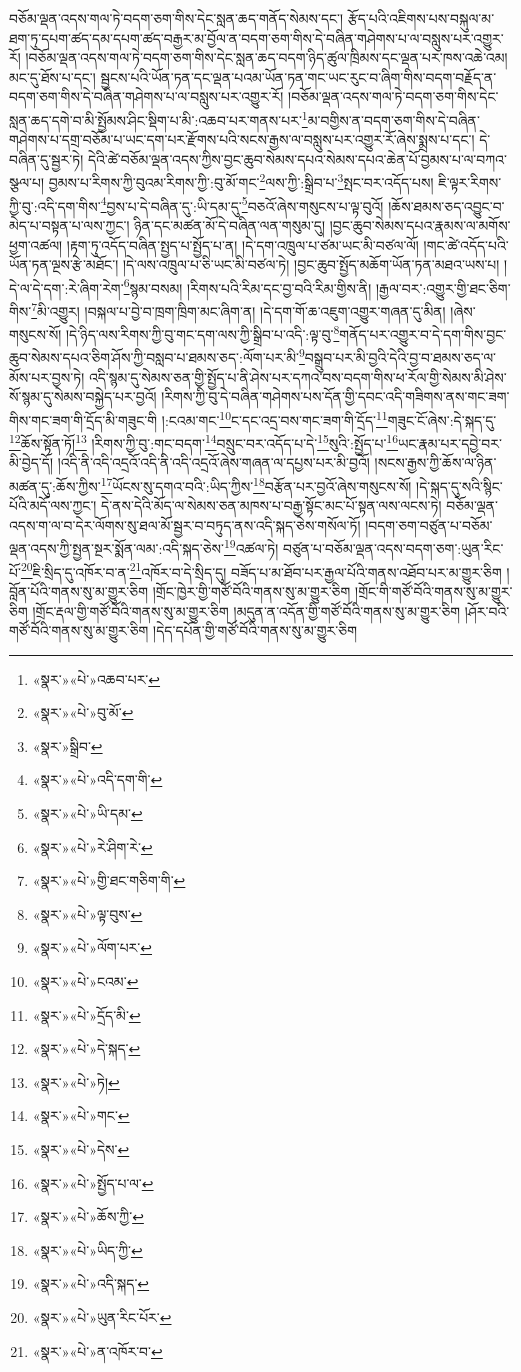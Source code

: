 བཅོམ་ལྡན་འདས་གལ་ཏེ་བདག་ཅག་གིས་དེང་སླན་ཆད་གནོད་སེམས་དང་། རྩོད་པའི་འཇིགས་པས་བསྐུལ་མ་ཐག་ཏུ་དཔག་ཚད་དམ་དཔག་ཚད་བརྒྱར་མ་བྱོལ་ན་བདག་ཅག་གིས་དེ་བཞིན་གཤེགས་པ་ལ་བསླུས་པར་འགྱུར་རོ། །བཅོམ་ལྡན་འདས་གལ་ཏེ་བདག་ཅག་གིས་དེང་སླན་ཆད་བདག་ཉིད་ཚུལ་ཁྲིམས་དང་ལྡན་པར་ཁས་འཆེ་འམ། མང་དུ་ཐོས་པ་དང་། སྦྱངས་པའི་ཡོན་ཏན་དང་ལྡན་པའམ་ཡོན་ཏན་གང་ཡང་རུང་བ་ཞིག་གིས་བདག་བརྗོད་ན་བདག་ཅག་གིས་དེ་བཞིན་གཤེགས་པ་ལ་བསླུས་པར་འགྱུར་རོ། །བཅོམ་ལྡན་འདས་གལ་ཏེ་བདག་ཅག་གིས་དེང་སླན་ཆད་དགེ་བ་མི་སྤྱོམས་ཤིང་སྡིག་པ་མི་:འཆབ་པར་གནས་པར་\footnote{«སྣར་»«པེ་»འཆབ་པར་}མ་བགྱིས་ན་བདག་ཅག་གིས་དེ་བཞིན་གཤེགས་པ་དགྲ་བཅོམ་པ་ཡང་དག་པར་རྫོགས་པའི་སངས་རྒྱས་ལ་བསླུས་པར་འགྱུར་རོ་ཞེས་སྨྲས་པ་དང་། དེ་བཞིན་དུ་སྦྱར་ཏེ། དེའི་ཚེ་བཅོམ་ལྡན་འདས་ཀྱིས་བྱང་ཆུབ་སེམས་དཔའ་སེམས་དཔའ་ཆེན་པོ་བྱམས་པ་ལ་བཀའ་སྩལ་པ། བྱམས་པ་རིགས་ཀྱི་བུའམ་རིགས་ཀྱི་:བུ་མོ་གང་\footnote{«སྣར་»«པེ་»བུ་མོ་}ལས་ཀྱི་:སྒྲིབ་པ་\footnote{«སྣར་»སྒྲིབ་}སྤང་བར་འདོད་པས། ཇི་ལྟར་རིགས་ཀྱི་བུ་:འདི་དག་གིས་\footnote{«སྣར་»«པེ་»འདི་དག་གི་}བྱས་པ་དེ་བཞིན་དུ་:ཡི་དམ་དུ་\footnote{«སྣར་»«པེ་»ཡི་དམ་}བཅའོ་ཞེས་གསུངས་པ་ལྟ་བུའོ། །ཆོས་ཐམས་ཅད་འབྱུང་བ་མེད་པ་བསྟན་པ་ལས་ཀྱང་། ཉིན་དང་མཚན་མོ་དེ་བཞིན་ལན་གསུམ་དུ། །བྱང་ཆུབ་སེམས་དཔའ་རྣམས་ལ་མགོས་ཕྱག་འཚལ། །རྟག་ཏུ་འདོད་བཞིན་སྤྱད་པ་སྤྱོད་པ་ན། །དེ་དག་འཁྲུལ་པ་ཙམ་ཡང་མི་བཙལ་ལོ། །གང་ཚེ་འདོད་པའི་ཡོན་ཏན་ལྔས་རྩེ་མཐོང་། །དེ་ལས་འཁྲུལ་པ་ཅི་ཡང་མི་བཙལ་ཏེ། །བྱང་ཆུབ་སྤྱོད་མཆོག་ཡོན་ཏན་མཐའ་ཡས་པ། །དེ་ལ་དེ་དག་:རེ་ཞིག་རེག་\footnote{«སྣར་»«པེ་»རེ་ཤིག་རེ་}སྙམ་བསམ། །རིགས་པའི་རིམ་དང་བྱ་བའི་རིམ་གྱིས་ནི། །རྒྱལ་བར་:འགྱུར་གྱི་ཐང་ཅིག་གིས་\footnote{«སྣར་»«པེ་»གྱི་ཐང་གཅིག་གི་}མི་འགྱུར། །བསྐལ་པ་བྱེ་བ་ཁྲག་ཁྲིག་མང་ཞིག་ན། །དེ་དག་གོ་ཆ་འཇུག་འགྱུར་གཞན་དུ་མིན། །ཞེས་གསུངས་སོ། །དེ་ཉིད་ལས་རིགས་ཀྱི་བུ་གང་དག་ལས་ཀྱི་སྒྲིབ་པ་འདི་:ལྟ་བུ་\footnote{«སྣར་»«པེ་»ལྟ་བུས་}གནོད་པར་འགྱུར་བ་དེ་དག་གིས་བྱང་ཆུབ་སེམས་དཔའ་ཅིག་ཤོས་ཀྱི་བསླབ་པ་ཐམས་ཅད་:ལོག་པར་མི་\footnote{«སྣར་»«པེ་»ལོག་པར་}བསྒྲུབ་པར་མི་བྱའི་དེའི་བྱ་བ་ཐམས་ཅད་ལ་མོས་པར་བྱས་ཏེ། འདི་སྙམ་དུ་སེམས་ཅན་གྱི་སྤྱོད་པ་ནི་ཤེས་པར་དཀའ་བས་བདག་གིས་ཕ་རོལ་གྱི་སེམས་མི་ཤེས་སོ་སྙམ་དུ་སེམས་བསྐྱེད་པར་བྱའོ། །རིགས་ཀྱི་བུ་དེ་བཞིན་གཤེགས་པས་དོན་གྱི་དབང་འདི་གཟིགས་ནས་གང་ཟག་གིས་གང་ཟག་གི་དྲོད་མི་གཟུང་གི །:ངའམ་གང་\footnote{«སྣར་»«པེ་»ངའམ་}ང་དང་འདྲ་བས་གང་ཟག་གི་དྲོད་\footnote{«སྣར་»«པེ་»དྲོད་མི་}གཟུང་ངོ་ཞེས་:དེ་སྐད་དུ་\footnote{«སྣར་»«པེ་»དེ་སྐད་}ཆོས་སྟོན་ཏོ།\footnote{«སྣར་»«པེ་»ཏེ།} །རིགས་ཀྱི་བུ་:གང་བདག་\footnote{«སྣར་»«པེ་»གང་}བསྲུང་བར་འདོད་པ་དེ་\footnote{«སྣར་»«པེ་»དེས་}སུའི་:སྤྱོད་པ་\footnote{«སྣར་»«པེ་»སྤྱོད་པ་ལ་}ཡང་རྣམ་པར་དབྱེ་བར་མི་བྱེད་དོ། །འདི་ནི་འདི་འདྲའོ་འདི་ནི་འདི་འདྲའོ་ཞེས་གཞན་ལ་དཔྱས་པར་མི་བྱའོ། །སངས་རྒྱས་ཀྱི་ཆོས་ལ་ཉིན་མཚན་དུ་:ཆོས་ཀྱིས་\footnote{«སྣར་»«པེ་»ཆོས་ཀྱི་}ཡོངས་སུ་དགའ་བའི་:ཡིད་ཀྱིས་\footnote{«སྣར་»«པེ་»ཡིད་ཀྱི་}བརྩོན་པར་བྱའོ་ཞེས་གསུངས་སོ། །དེ་སྐད་དུ་སའི་སྙིང་པོའི་མདོ་ལས་ཀྱང་། དེ་ནས་དེའི་མོད་ལ་སེམས་ཅན་མཁས་པ་བརྒྱ་སྟོང་མང་པོ་སྟན་ལས་ལངས་ཏེ། བཅོམ་ལྡན་འདས་ག་ལ་བ་དེར་ལོགས་སུ་ཐལ་མོ་སྦྱར་བ་བཏུད་ནས་འདི་སྐད་ཅེས་གསོལ་ཏོ། །བདག་ཅག་བཙུན་པ་བཅོམ་ལྡན་འདས་ཀྱི་སྤྱན་སྔར་སྨོན་ལམ་:འདི་སྐད་ཅེས་\footnote{«སྣར་»«པེ་»འདི་སྐད་}འཚལ་ཏེ། བཙུན་པ་བཅོམ་ལྡན་འདས་བདག་ཅག་:ཡུན་རིང་པོ་\footnote{«སྣར་»«པེ་»ཡུན་རིང་པོར་}ཇི་སྲིད་དུ་འཁོར་བ་ན་\footnote{«སྣར་»«པེ་»ན་འཁོར་བ་}འཁོར་བ་དེ་སྲིད་དུ། བཟོད་པ་མ་ཐོབ་པར་རྒྱལ་པོའི་གནས་འཐོབ་པར་མ་གྱུར་ཅིག །བློན་པོའི་གནས་སུ་མ་གྱུར་ཅིག །གྲོང་ཁྱེར་གྱི་གཙོ་བོའི་གནས་སུ་མ་གྱུར་ཅིག །གྲོང་གི་གཙོ་བོའི་གནས་སུ་མ་གྱུར་ཅིག །གྲོང་རྡལ་གྱི་གཙོ་བོའི་གནས་སུ་མ་གྱུར་ཅིག །མདུན་ན་འདོན་གྱི་གཙོ་བོའི་གནས་སུ་མ་གྱུར་ཅིག །ཤོར་བའི་གཙོ་བོའི་གནས་སུ་མ་གྱུར་ཅིག །དེད་དཔོན་གྱི་གཙོ་བོའི་གནས་སུ་མ་གྱུར་ཅིག 